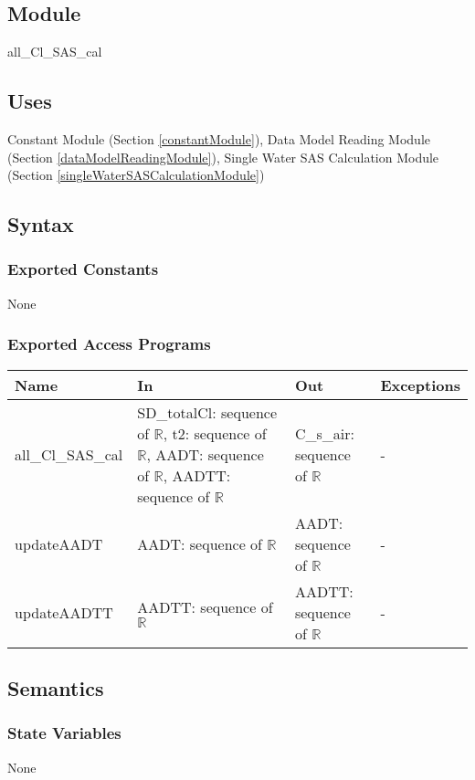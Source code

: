 \documentclass[12pt, titlepage]{article}
\begin{document}
\subsection{Module}
all\_Cl\_SAS\_cal

\subsection{Uses}
Constant Module (Section \ref{constantModule}), Data Model Reading Module (Section \ref{dataModelReadingModule}), Single Water SAS Calculation Module (Section \ref{singleWaterSASCalculationModule})


\subsection{Syntax}

\subsubsection{Exported Constants}
None
\subsubsection{Exported Access Programs}

\begin{center}
\begin{tabular}{p{2.5cm} p{4.5cm} p{5cm} p{2cm}}
\hline
\textbf{Name} & \textbf{In} & \textbf{Out} & \textbf{Exceptions} \\
\hline
all\_Cl\_SAS\_cal & SD\_totalCl: sequence of $\mathbb{R}$, t2: sequence of $\mathbb{R}$, AADT: sequence of $\mathbb{R}$, AADTT: sequence of $\mathbb{R}$ & C\_s\_air: sequence of $\mathbb{R}$ & - \\
updateAADT & AADT: sequence of $\mathbb{R}$ & AADT: sequence of $\mathbb{R}$ & - \\
updateAADTT & AADTT: sequence of $\mathbb{R}$ & AADTT: sequence of $\mathbb{R}$ & - \\
\hline
\end{tabular}
\end{center}

\subsection{Semantics}

\subsubsection{State Variables}
None
\end{document}
